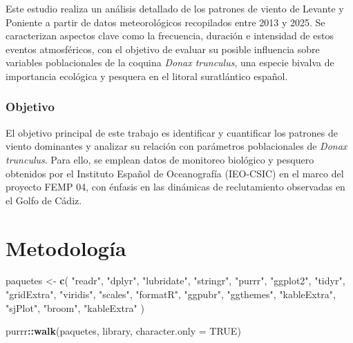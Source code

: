 \documentclass[
]{article}
\newenvironment{Shaded}{\begin{snugshade}}{\end{snugshade}}
\newcommand{\AttributeTok}[1]{\textcolor[rgb]{0.13,0.29,0.53}{#1}}
\newcommand{\ConstantTok}[1]{\textcolor[rgb]{0.56,0.35,0.01}{#1}}
\newcommand{\FunctionTok}[1]{\textcolor[rgb]{0.13,0.29,0.53}{\textbf{#1}}}
\newcommand{\NormalTok}[1]{#1}
\newcommand{\OtherTok}[1]{\textcolor[rgb]{0.56,0.35,0.01}{#1}}
\newcommand{\SpecialCharTok}[1]{\textcolor[rgb]{0.81,0.36,0.00}{\textbf{#1}}}
\newcommand{\StringTok}[1]{\textcolor[rgb]{0.31,0.60,0.02}{#1}}
\begin{document}
Este estudio realiza un análisis detallado de los patrones de viento de Levante y Poniente a partir de datos meteorológicos recopilados entre 2013 y 2025. Se caracterizan aspectos clave como la frecuencia, duración e intensidad de estos eventos atmosféricos, con el objetivo de evaluar su posible influencia sobre variables poblacionales de la coquina \emph{Donax trunculus}, una especie bivalva de importancia ecológica y pesquera en el litoral suratlántico español.

\subsubsection{Objetivo}\label{objetivo}

El objetivo principal de este trabajo es identificar y cuantificar los patrones de viento dominantes y analizar su relación con parámetros poblacionales de \emph{Donax trunculus}. Para ello, se emplean datos de monitoreo biológico y pesquero obtenidos por el Instituto Español de Oceanografía (IEO-CSIC) en el marco del proyecto FEMP 04, con énfasis en las dinámicas de reclutamiento observadas en el Golfo de Cádiz.

\newpage

\section{Metodología}\label{metodologuxeda}

\begin{Shaded}
\begin{Highlighting}[]
\NormalTok{paquetes }\OtherTok{\textless{}{-}} \FunctionTok{c}\NormalTok{(}
  \StringTok{"readr"}\NormalTok{, }\StringTok{"dplyr"}\NormalTok{, }\StringTok{"lubridate"}\NormalTok{, }\StringTok{"stringr"}\NormalTok{, }\StringTok{"purrr"}\NormalTok{,}
  \StringTok{"ggplot2"}\NormalTok{, }\StringTok{"tidyr"}\NormalTok{, }\StringTok{"gridExtra"}\NormalTok{, }\StringTok{"viridis"}\NormalTok{, }\StringTok{"scales"}\NormalTok{,}
  \StringTok{"formatR"}\NormalTok{, }\StringTok{"ggpubr"}\NormalTok{, }\StringTok{"ggthemes"}\NormalTok{, }\StringTok{"kableExtra"}\NormalTok{, }\StringTok{"sjPlot"}\NormalTok{, }
  \StringTok{"broom"}\NormalTok{, }\StringTok{"kableExtra"}
\NormalTok{  )}

\NormalTok{purrr}\SpecialCharTok{::}\FunctionTok{walk}\NormalTok{(paquetes, library, }\AttributeTok{character.only =} \ConstantTok{TRUE}\NormalTok{)}
\end{Highlighting}
\end{Shaded}
\end{document}
